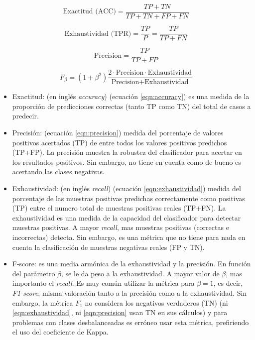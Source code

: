 \begin{equation}
	\mbox{Exactitud (ACC)} = \dfrac{TP+TN}{TP+TN+FP+FN}
	\label{eqn:accuracy}
\end{equation}

\begin{equation}
	\mbox{Exhaustividad (TPR)} = \dfrac{TP}{P} = \dfrac{TP}{TP+FN}
	\label{eqn:exhaustividad}
\end{equation}

\begin{equation}
	\mbox{Precision} = \dfrac{TP}{TP+FP}
	\label{eqn:precision}
\end{equation}

\begin{equation}
	F_{\beta} = \left(1+\beta^{2}\right) \dfrac{2\cdot \mbox{Precision}\cdot \mbox{Exhaustividad}}{\mbox{Precision}+\mbox{Exhaustividad}}
	\label{eqn:fbeta_score}
\end{equation}

\begin{itemize}
	\item Exactitud: (en inglés \textit{accuracy}) (ecuación \ref{eqn:accuracy}) es una medida de la proporción de predicciones correctas (tanto TP como TN) del total de casos a predecir.
	\item Precisión: (ecuación \ref{eqn:precision}) medida del porcentaje de valores positivos acertados (TP) de entre todos los valores positivos predichos (TP+FP). La precisión muestra la robustez del clasificador para acertar en los resultados positivos. Sin embargo, no tiene en cuenta como de bueno es acertando las clases negativas.
	\item Exhaustividad: (en inglés \textit{recall}) (ecuación \ref{eqn:exhaustividad}) medida del porcentaje de las muestras positivas predichas correctamente como positivas (TP) entre el numero total de muestras positivas reales (TP+FN). La exhaustividad es una medida de la capacidad del clasificador para detectar muestras positivas. A mayor \textit{recall}, mas muestras positivas (correctas e incorrectas) detecta. Sin embargo, es una métrica que no tiene para nada en cuenta la clasificación de muestras negativas reales (FP y TN).
	\item F-score: es una media armónica de la exhaustividad y la precisión. En función del parámetro $\beta$, se le da peso a la exhaustividad. A mayor valor de $\beta$, mas importanto el \textit{recall}. Es muy común utilizar la métrica para $\beta=1$, es decir, \textit{F1-score}, misma valoración tanto a la precisión como a la exhaustividad. Sin embargo, la métrica $F_{1}$ no considera los negativos verdaderos (TN) (ni \ref{eqn:exhaustividad}, ni \ref{eqn:precision} usan TN en sus cálculos) y para problemas con clases desbalanceadas es erróneo usar esta métrica, prefiriendo el uso del coeficiente de 	Kappa\cite{https://doi.org/10.48550/arxiv.2010.16061}.
\end{itemize}

